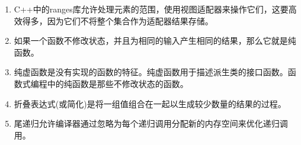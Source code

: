 \begin{enumerate}
	\item C++中的ranges库允许处理元素的范围，使用视图适配器来操作它们，这要高效得多，因为它们不将整个集合作为适配器结果存储。
	\item 如果一个函数不修改状态，并且为相同的输入产生相同的结果，那么它就是纯函数。
	\item 纯虚函数是没有实现的函数的特征。纯虚函数用于描述派生类的接口函数。函数式编程中的纯函数是那些不修改状态的函数。
	\item 折叠表达式(或简化)是将一组值组合在一起以生成较少数量的结果的过程。
	\item 尾递归允许编译器通过忽略为每个递归调用分配新的内存空间来优化递归调用。
\end{enumerate}












